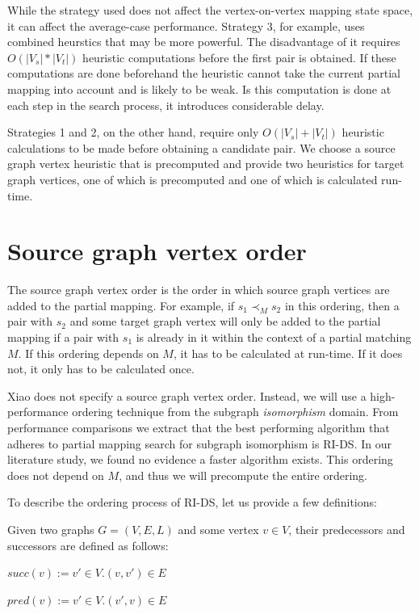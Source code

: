 While the strategy used does not affect the vertex-on-vertex mapping state space, it can affect the average-case performance. Strategy 3, for example, uses combined heurstics that may be more powerful. The disadvantage of it requires $O(|V_s|*|V_t|)$ heuristic computations before the first pair is obtained. If these computations are done beforehand the heuristic cannot take the current partial mapping into account and is likely to be weak. Is this computation is done at each step in the search process, it introduces considerable delay.

Strategies 1 and 2, on the other hand, require only $O(|V_s|+|V_t|)$ heuristic calculations to be made before obtaining a candidate pair. We choose a source graph vertex heuristic that is precomputed and provide two heuristics for target graph vertices, one of which is precomputed and one of which is calculated run-time.

\section{Source graph vertex order}
\label{sec:sourceOrder}
The source graph vertex order is the order in which source graph vertices are added to the partial mapping. For example, if $s_1 \prec_M s_2$ in this ordering, then a pair with $s_2$ and some target graph vertex will only be added to the partial mapping if a pair with $s_1$ is already in it within the context of a partial matching $M$. If this ordering depends on $M$, it has to be calculated at run-time. If it does not, it only has to be calculated once.

Xiao does not specify a source graph vertex order. Instead, we will use a high-performance ordering technique from the subgraph \textit{isomorphism} domain. From performance comparisons we extract that the best performing algorithm that adheres to partial mapping search for subgraph isomorphism is RI-DS. In our literature study, we found no evidence a faster algorithm exists. This ordering does not depend on $M$, and thus we will precompute the entire ordering.

To describe the ordering process of RI-DS, let us provide a few definitions:

\begin{defn}
Given two graphs $G=(V, E, L)$ and some vertex $v \in V$, their predecessors and successors are defined as follows:

$\mathit{succ}(v) := {v' \in V . (v, v') \in E}$

$\mathit{pred}(v) := {v' \in V . (v', v) \in E}$
 
\end{defn}


